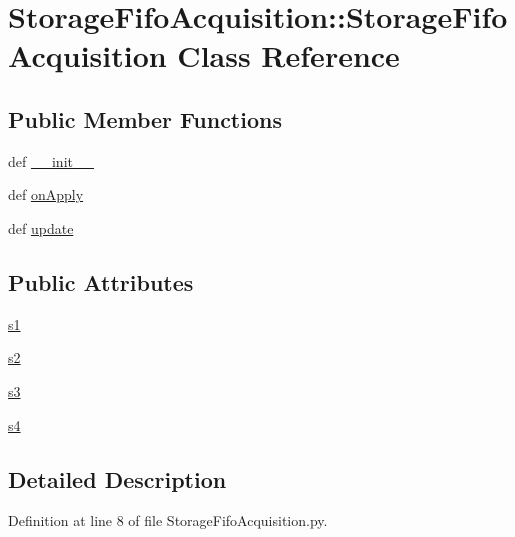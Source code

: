 \hypertarget{classStorageFifoAcquisition_1_1StorageFifoAcquisition}{
\section{StorageFifoAcquisition::StorageFifoAcquisition Class Reference}
\label{classStorageFifoAcquisition_1_1StorageFifoAcquisition}
}
\subsection*{Public Member Functions}
\begin{DoxyCompactItemize}
\item 
def \hyperlink{classStorageFifoAcquisition_1_1StorageFifoAcquisition_a2ff9fedd875f1052c463d863abd6b63a}{\_\-\_\-init\_\-\_\-}
\item 
def \hyperlink{classStorageFifoAcquisition_1_1StorageFifoAcquisition_a18b2663375af7ca99203e3e0b404b045}{onApply}
\item 
def \hyperlink{classStorageFifoAcquisition_1_1StorageFifoAcquisition_a276f4c3f4d8bde7a86f4dbc0d708fb93}{update}
\end{DoxyCompactItemize}
\subsection*{Public Attributes}
\begin{DoxyCompactItemize}
\item 
\hyperlink{classStorageFifoAcquisition_1_1StorageFifoAcquisition_a7cd0cec2d3b2189735989941f9df5c56}{s1}
\item 
\hyperlink{classStorageFifoAcquisition_1_1StorageFifoAcquisition_a9cb50ffb80555f341f672005aca9af88}{s2}
\item 
\hyperlink{classStorageFifoAcquisition_1_1StorageFifoAcquisition_af26ec50fabb3155b0861e08652bbc92d}{s3}
\item 
\hyperlink{classStorageFifoAcquisition_1_1StorageFifoAcquisition_af2ca6435938725459ba9cfc11d6a6d93}{s4}
\end{DoxyCompactItemize}


\subsection{Detailed Description}


Definition at line 8 of file StorageFifoAcquisition.py.

